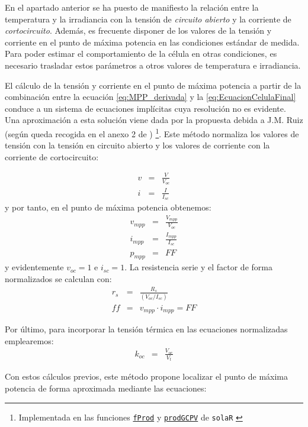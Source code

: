 En el apartado anterior se ha puesto de manifiesto la relación entre
la temperatura y la irradiancia con la tensión de \emph{circuito abierto}
y la corriente de \emph{cortocircuito}. Además, es frecuente disponer
de los valores de la tensión y corriente en el punto de máxima potencia
en las condiciones estándar de medida. Para poder estimar el comportamiento
de la célula en otras condiciones, es necesario trasladar estos parámetros
a otros valores de temperatura e irradiancia.

El cálculo de la tensión y corriente en el punto de máxima potencia
a partir de la combinación entre la ecuación \ref{eq:MPP_derivada}
y la \ref{eq:EcuacionCelulaFinal} conduce a un sistema de ecuaciones
implícitas cuya resolución no es evidente. Una aproximación a esta
solución viene dada por la propuesta debida a J.M. Ruiz (según queda
recogida en el anexo 2 de \cite{Alonso-Garcia2005})%
\footnote{Implementada en las funciones
  \href{http://search.r-project.org/R/library/solaR/html/fProd.html}{\texttt{fProd}}
  y %
 \href{http://search.r-project.org/R/library/solaR/html/prodGCPV.html}{\texttt{prodGCPV}} de \texttt{solaR}
  \cite{Perpinan2012b}}. Este método
normaliza los valores de tensión con la tensión en circuito abierto
y los valores de corriente con la corriente de cortocircuito:

\begin{eqnarray}
v & = & \frac{V}{V_{oc}}\\
i & = & \frac{I}{I_{sc}}\end{eqnarray}
y por tanto, en el punto de máxima potencia obtenemos:\begin{eqnarray}
v_{mpp} & = & \frac{V_{mpp}}{V_{oc}}\\
i_{mpp} & = & \frac{I_{mpp}}{I_{sc}}\\
p_{mpp} & = & FF\end{eqnarray}
y evidentemente $v_{oc}=1$ e $i_{sc}=1$. La resistencia serie y
el factor de forma normalizados se calculan con:\begin{eqnarray}
r_{s} & = & \frac{R_{s}}{(V_{oc}/I_{sc})}\label{eq:rs}\\
ff & = & v_{mpp}\cdot i_{mpp}=FF\end{eqnarray}


Por último, para incorporar la tensión térmica en las ecuaciones normalizadas
emplearemos: \begin{eqnarray}
k_{oc} & = & \frac{V_{oc}}{V_{t}}\label{eq:koc}\end{eqnarray}


Con estos cálculos previos, este método propone localizar el punto
de máxima potencia de forma aproximada mediante las ecuaciones:

